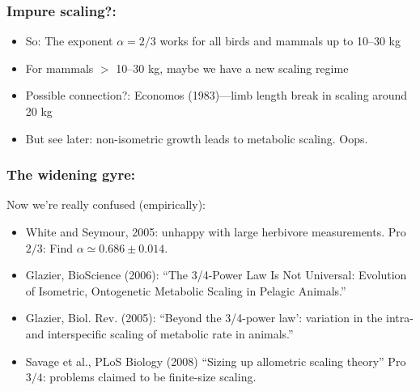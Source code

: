 \begin{frame}
  \frametitle{Impure scaling?:}

  \begin{block}{}
  \begin{itemize}
  \item<1-> 
    So: The exponent $\alpha = 2/3$ works for all birds and
    mammals up to 10--30 kg
  \item<2-> 
    For mammals $>$ 10--30 kg, maybe we have a new scaling regime
  \item<3-> 
    Possible connection?: 
    Economos (1983)---limb length break in scaling around 20 kg\cite{economos1983a}
  \item<4-> 
    But see later: non-isometric growth leads to  metabolic scaling.  Oops.
  \end{itemize}
  \end{block}

\end{frame}

\begin{frame}
  \frametitle{The widening gyre:}


  \begin{block}{Now we're really confused (empirically):}
    \begin{itemize}
    \item<+-> 
      White and Seymour, 2005: unhappy with large herbivore measurements\cite{white2005a}.
      Pro $2/3$: Find $\alpha \simeq 0.686 \pm 0.014$.
    \item<+-> 
      Glazier, BioScience (2006)\cite{glazier2006a}:
      ``The 3/4-Power Law Is Not Universal: {E}volution of Isometric, 
      Ontogenetic Metabolic Scaling in Pelagic Animals.''
    \item<+-> 
      Glazier, Biol. Rev. (2005)\cite{glazier2005a}:
      ``Beyond the 3/4-power law': variation in the intra- 
      and interspecific scaling of metabolic rate in animals.''
    \item<+-> 
      Savage et al., PLoS Biology (2008)\cite{savage2008a}
      ``Sizing up allometric scaling theory''
      Pro $3/4$: problems claimed to be finite-size scaling.
    \end{itemize}
  \end{block}

\end{frame}


